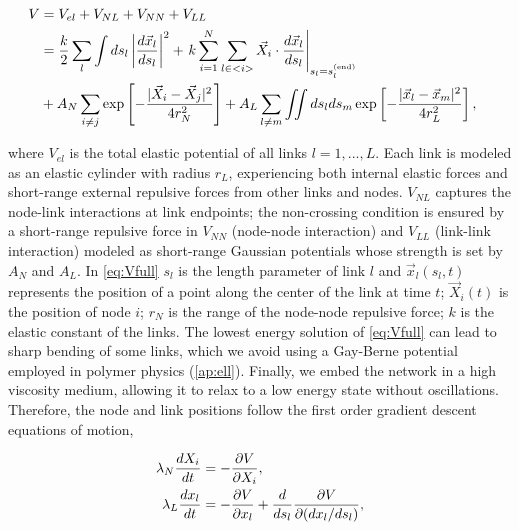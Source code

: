\documentclass[linenumbers,endfloats,nofootinbib,preprint,floatfix,titlepage,superscriptaddress]{revtex4-1} %
\begin{document}
\begin{align}
    V &= V_{el} + V_{NL} +V_{NN} + V_{LL} \cr 
    &= {k\over 2}\sum_l\int ds_l \left|{d\vec{x}_l\over ds_l} \right|^2 + 
    \left. k\sum_{i=1}^N  \sum_{l\in <i>}  \vec{X}_i \cdot{d\vec{x}_l%
    \over ds_l}\right|_{s_l = s_l^{(\mathrm{end})}}
    \cr
    &+ A_N\sum_{i\ne j}  \exp\left[- {|\vec{X}_i-\vec{X}_j|^2 \over 4r_N^2}\right]+A_L\sum_{l\ne m} \iint ds_lds_m 
    \exp\left[- {|\vec{x}_l-\vec{x}_m|^2 \over 4 r_L^2}\right] ,
 \label{eq:Vfull}
\end{align}
\begin{linenumbers}
where $V_{el}$ is the total elastic potential of all links $l=1,...,L$. 
Each link is modeled as an elastic cylinder with radius $r_L$, experiencing both internal elastic forces and short-range external repulsive forces from other links and nodes. $V_{NL}$ captures the node-link interactions at link endpoints;
the non-crossing condition is ensured by a short-range repulsive force in
$V_{NN}$  (node-node interaction)  and  $V_{LL}$ (link-link interaction) modeled as short-range Gaussian potentials whose strength is set by $A_N$ and $A_L$. 
In \eqref{eq:Vfull} $s_l$ is the length parameter of link $l$ and  $\vec{x}_l(s_l,t)$ represents the position of a point along the center of the link at time $t$;
$\vec{X}_i(t)$ is the position of node $i$; $r_N$ is the range of the node-node repulsive force; $k$ is the elastic constant of the links.
The lowest energy solution of \eqref{eq:Vfull} can lead to sharp bending of some links, which we avoid using a Gay-Berne potential \cite{gay1981modification} %
employed in polymer physics %
\citep{everaers2003interaction,babadi2006coarse} (\ref{ap:ell}). 
Finally, we embed the network in a high viscosity medium, allowing it to relax to a low energy state without oscillations.
Therefore, the node and link positions follow the first order gradient descent equations of motion, 
\end{linenumbers}
\begin{align}
    \lambda_N {dX_i\over dt} &= -{\ro V \over \ro X_i} %
    \label{eq:nodes},\\
    \lambda_L {dx_l \over dt} & =  -{\ro V \over \ro x_l} + {d\over ds_l} {\ro V \over \ro (dx_l /ds_l)}   \label{eq:Langevin0},
\end{align}
\end{document}

